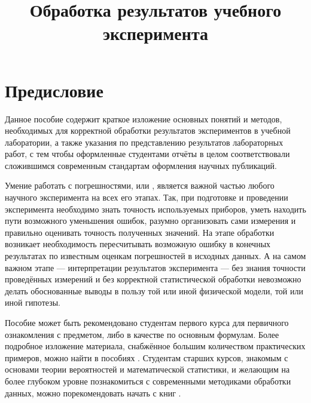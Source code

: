\documentclass[a5paper,10pt,oneside]{report}
\begin{document}
\title{Обработка результатов учебного эксперимента}


\maketitle
\tableofcontents


\chapter*{Предисловие}
    Данное пособие содержит краткое изложение основных понятий и методов,
    необходимых для корректной обработки результатов экспериментов в учебной
    лаборатории, а также указания по представлению результатов лабораторных
    работ, с тем чтобы оформленные студентами отчёты в целом соответствовали
    сложившимся современным стандартам оформления научных публикаций.

    Умение работать с погрешностями, или ,
    является важной частью любого научного эксперимента на всех его этапах.
    Так, при подготовке и проведении эксперимента необходимо знать точность
    используемых приборов, уметь находить пути возможного уменьшения ошибок,
    разумно организовать сами измерения и правильно оценивать точность
    полученных значений. На этапе обработки возникает необходимость пересчитывать
    возможную ошибку в конечных результатах по известным оценкам погрешностей
    в исходных данных. А на самом важном этапе --- интерпретации
    результатов эксперимента --- без знания точности проведённых
    измерений и без корректной статистической обработки невозможно делать
    обоснованные выводы в пользу той или иной физической модели, той или
    иной гипотезы.

    Пособие может быть рекомендовано студентам первого курса для первичного
    ознакомления с предметом, либо в качестве 
    по основным формулам. Более подробное изложение материала, снабжённое
    большим количеством практических примеров, можно найти в пособиях
    \cite{taylor,squires,zaidel}. Студентам старших курсов, знакомым
    с основами теории вероятностей и математической статистики, и желающим
    на более глубоком уровне познакомиться с современными методиками обработки
    данных, можно порекомендовать начать с книг \cite{hudson,idie}.






\end{document}
